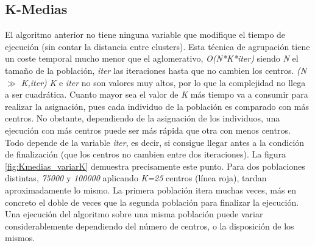 					
	
	
	\newpage
	
	\subsection{K-Medias}	

		El algoritmo anterior no tiene ninguna variable que modifique el tiempo de ejecución (sin contar la distancia entre clusters). Esta técnica de agrupación tiene un coste temporal mucho menor que el aglomerativo, \textit{O(N*K*iter)} siendo \textit{N} el tamaño de la población, \textit{iter} las iteraciones  hasta que no cambien los centros. \textit{(N $\gg$ K,iter)} \textit{K} e \textit{iter} no son valores muy altos, por lo que la complejidad no llega a ser cuadrática. Cuanto mayor sea el valor de \textit{K} más tiempo va a consumir para realizar la asignación, pues cada individuo de la población es comparado con más centros. No obstante, dependiendo de la asignación de los individuos,  una ejecución con más centros puede ser más rápida que otra con menos centros. Todo depende de la variable \textit{iter}, es decir, si consigue llegar antes a la condición de finalización (que los centros no cambien entre dos iteraciones). La figura \ref{fig:Kmedias_variarK} demuestra precisamente este punto. Para dos poblaciones distintas, \textit{75000} y \textit{100000} aplicando \textit{K=25}  centros (línea roja), tardan aproximadamente lo mismo. La primera población itera muchas veces, más en concreto el doble de veces que la segunda población para finalizar la ejecución. Una ejecución del algoritmo sobre una misma población puede variar considerablemente dependiendo del número de centros, o la disposición de los mismos.
		
		
		
